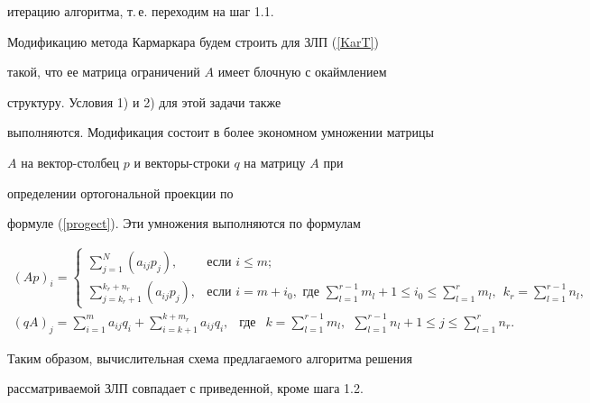 итерацию алгоритма, т.\,е. переходим на шаг 1.1.





Модификацию метода Кармаркара будем строить для ЗЛП (\ref{KarT})


такой, что ее матрица ограничений $A$ имеет блочную с окаймлением


структуру. Условия 1) и 2) для этой задачи также


выполняются. Модификация состоит в более экономном умножении матрицы


$A$ на вектор-столбец $p$ и векторы-строки $q$ на матрицу $A$ при


определении ортогональной проекции по


формуле (\ref{progect}). Эти умножения выполняются по формулам


\begin{gather*}


(Ap)_i=


\begin{cases}


\sum\limits_{j=1}^{N}(a_{ij}p_j), & \text{если } i\leq m;\\


\sum\limits_{j=k_r+1}^{k_r+n_{r}}(a_{ij}p_j),&\text{если }


i=m+i_{0},\text{ где }


\sum\limits_{l=1}^{r-1}m_{l}+1\leq i_{0}\leq \sum\limits_{l=1}^{r}m_{l},


\ \ k_r=\sum\limits_{l=1}^{r-1}n_l,


\end{cases} \\


%


(qA)_j = \sum\limits_{i=1}^{m}a_{ij}q_i+\sum\limits_{i=k+1}


^{k+m_r}a_{ij}q_i,\ \


\text{ где }\ \ k=\sum\limits_{l=1}^{r-1}m_l,


\ \ \sum\limits_{l=1}^{r-1}n_l+1\leq j


\leq \sum\limits_{l=1}^{r}n_{r}.


\end{gather*}





Таким образом, вычислительная схема предлагаемого алгоритма решения


рассматриваемой ЗЛП совпадает с приведенной, кроме шага 1.2.





